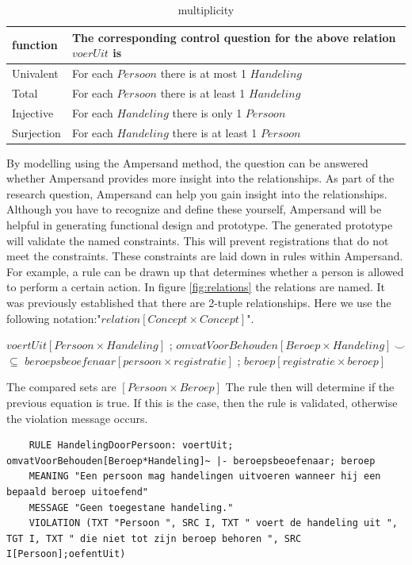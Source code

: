 \begin{table}[h!]
    \begin{tabular}{||l | l||} 
     \hline
    function & The corresponding control question for the above relation $voerUit$ is\\
    \hline\hline
        Univalent & For each $Persoon$ there is at most 1 $Handeling$\\ %
        Total & For each $Persoon$ there is at least 1 $Handeling$ \\ %
        Injective & For each $Handeling$ there is only 1 $Persoon$\\ %
        Surjection & For each $Handeling$ there is at least 1 $Persoon$\\ %
    \end{tabular}
    \caption{multiplicity}
    \label{tab:multiplicity}
\end{table}

By modelling using the Ampersand method, the question can be answered whether Ampersand provides more insight into the relationships.
As part of the research question, Ampersand can help you gain insight into the relationships.
Although you have to recognize and define these yourself, Ampersand will be helpful in generating functional design and prototype.
The generated prototype will validate the named constraints.
This will prevent registrations that do not meet the constraints.
These constraints are laid down in rules within Ampersand.
For example, a rule can be drawn up that determines whether a person is allowed to perform a certain action.
In figure \ref{fig:relations} the relations are named.
It was previously established that there are 2-tuple relationships.
Here we use the following notation:"$\mathit{relation [Concept \times Concept]}$".
\begin{center}
$\mathit{voertUit [Persoon \times Handeling]}$ ; 
 $\mathit{omvatVoorBehouden [Beroep \times Handeling]~\smallsmile}$
\newline $\subseteq$
\newline $\mathit{beroepsbeoefenaar [persoon \times registratie]}$ ;
$\mathit{beroep [registratie \times beroep]}$
\end{center}
The compared sets are
\newline $\mathit{[Persoon \times Beroep]}$
\newline The rule then will determine if the previous equation is true.
\newline If this is the case, then the rule is validated, otherwise the violation message occurs.
\begin{lstlisting}
    RULE HandelingDoorPersoon: voertUit; omvatVoorBehouden[Beroep*Handeling]~ |- beroepsbeoefenaar; beroep
    MEANING "Een persoon mag handelingen uitvoeren wanneer hij een bepaald beroep uitoefend"
    MESSAGE "Geen toegestane handeling."
    VIOLATION (TXT "Persoon ", SRC I, TXT " voert de handeling uit ", TGT I, TXT " die niet tot zijn beroep behoren ", SRC I[Persoon];oefentUit)
\end{lstlisting}


